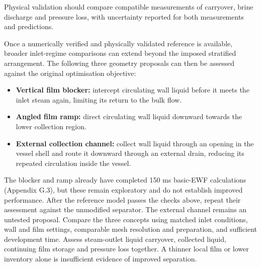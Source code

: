 Physical validation should compare compatible measurements of carryover, brine discharge and pressure loss, with uncertainty reported for both measurements and predictions.

Once a numerically verified and physically validated reference is available, broader inlet-regime comparisons can extend beyond the imposed stratified arrangement. The following three geometry proposals can then be assessed against the original optimisation objective:

\begin{itemize}
\item
  \textbf{Vertical film blocker:} intercept circulating wall liquid before it meets the inlet steam again, limiting its return to the bulk flow.
\item
  \textbf{Angled film ramp:} direct circulating wall liquid downward towards the lower collection region.
\item
  \textbf{External collection channel:} collect wall liquid through an opening in the vessel shell and route it downward through an external drain, reducing its repeated circulation inside the vessel.
\end{itemize}

The blocker and ramp already have completed 150 ms basic-EWF calculations (Appendix G.3), but these remain exploratory and do not establish improved performance. After the reference model passes the checks above, repeat their assessment against the unmodified separator. The external channel remains an untested proposal. Compare the three concepts using matched inlet conditions, wall and film settings, comparable mesh resolution and preparation, and sufficient development time. Assess steam-outlet liquid carryover, collected liquid, continuing film storage and pressure loss together. A thinner local film or lower inventory alone is insufficient evidence of improved separation.
